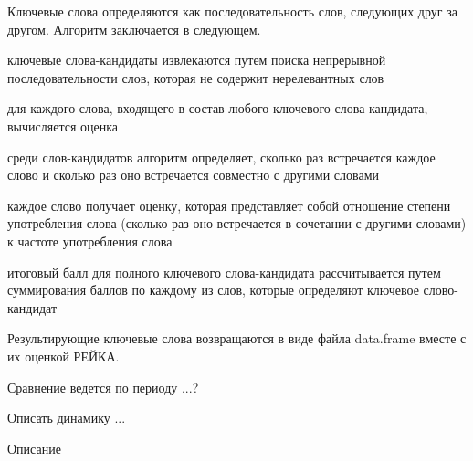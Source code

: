 \documentclass[bachelor, och, diploma ]{SCWorks}
\begin{document}
Ключевые слова определяются как последовательность слов, следующих друг за другом.
Алгоритм заключается в следующем.

ключевые слова-кандидаты извлекаются путем поиска непрерывной последовательности слов, которая не содержит нерелевантных слов

для каждого слова, входящего в состав любого ключевого слова-кандидата, вычисляется оценка

среди слов-кандидатов алгоритм определяет, сколько раз встречается каждое слово и сколько раз оно встречается совместно с другими словами

каждое слово получает оценку, которая представляет собой отношение степени употребления слова (сколько раз оно встречается в сочетании с другими словами) к частоте употребления слова

итоговый балл для полного ключевого слова-кандидата рассчитывается путем суммирования баллов по каждому из слов, которые определяют ключевое слово-кандидат

Результирующие ключевые слова возвращаются в виде файла data.frame вместе с их оценкой РЕЙКА.



Сравнение ведется по периоду ...?

Описать динамику ...

Описание




\conclusion
\end{document}
